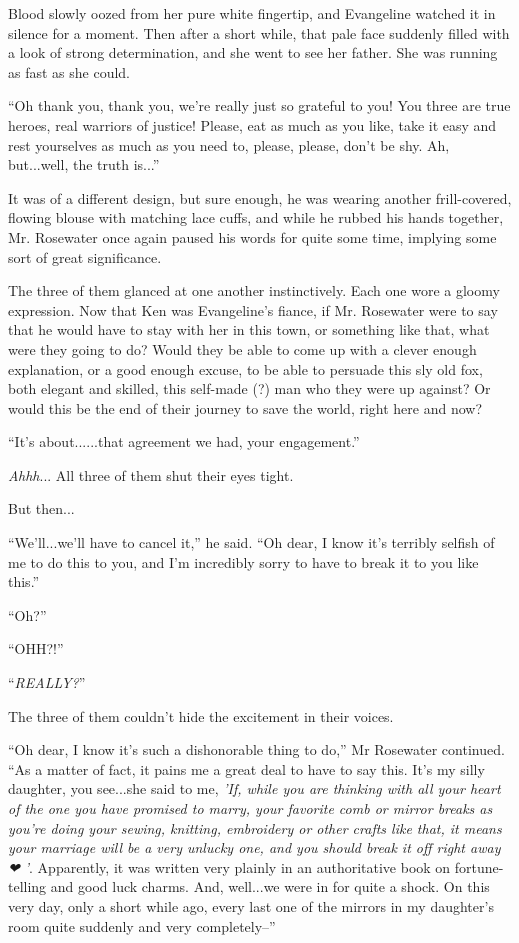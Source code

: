 \documentclass[
]{article}
\begin{document}
Blood slowly oozed from her pure white fingertip, and Evangeline watched
it in silence for a moment. Then after a short while, that pale face
suddenly filled with a look of strong determination, and she went to see
her father. She was running as fast as she could.

``Oh thank you, thank you, we're really just so grateful to you! You
three are true heroes, real warriors of justice! Please, eat as much as
you like, take it easy and rest yourselves as much as you need to,
please, please, don't be shy. Ah, but...well, the truth is...''

It was of a different design, but sure enough, he was wearing another
frill-covered, flowing blouse with matching lace cuffs, and while he
rubbed his hands together, Mr. Rosewater once again paused his words for
quite some time, implying some sort of great significance.

The three of them glanced at one another instinctively. Each one wore a
gloomy expression. Now that Ken was Evangeline's fiance, if Mr.
Rosewater were to say that he would have to stay with her in this town,
or something like that, what were they going to do? Would they be able
to come up with a clever enough explanation, or a good enough excuse, to
be able to persuade this sly old fox, both elegant and skilled, this
self-made (?) man who they were up against? Or would this be the end of
their journey to save the world, right here and now?

``It's about......that agreement we had, your engagement.''

\emph{Ahhh}... All three of them shut their eyes tight.

But then...

``We'll...we'll have to cancel it,'' he said. ``Oh dear, I know it's
terribly selfish of me to do this to you, and I'm incredibly sorry to
have to break it to you like this.''

``Oh?''

``OHH?!''

``\emph{REALLY?}''

The three of them couldn't hide the excitement in their voices.

``Oh dear, I know it's such a dishonorable thing to do,'' Mr Rosewater
continued. ``As a matter of fact, it pains me a great deal to have to
say this. It's my silly daughter, you see...she said to me, \emph{'If,
while you are thinking with all your heart of the one you have promised
to marry, your favorite comb or mirror breaks as you're doing your
sewing, knitting, embroidery or other crafts like that, it means your
marriage will be a very unlucky one, and you should break it off right
away ❤ '}. Apparently, it was written very plainly in an authoritative
book on fortune-telling and good luck charms. And, well...we were in for
quite a shock. On this very day, only a short while ago, every last one
of the mirrors in my daughter's room quite suddenly and very
completely--''
\end{document}
